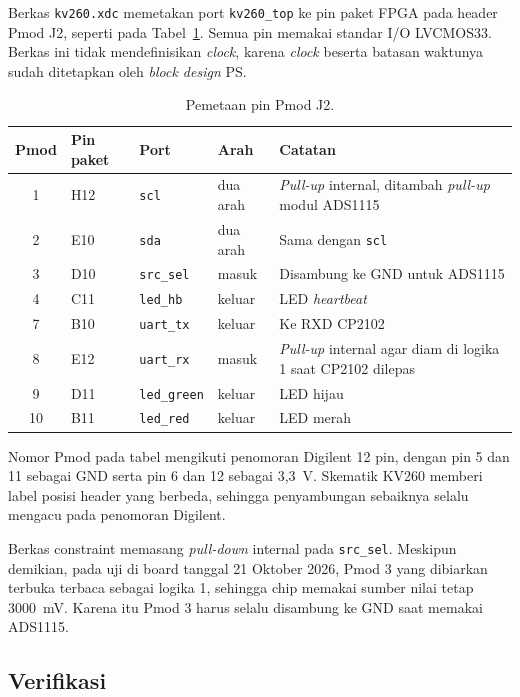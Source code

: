 \documentclass[11pt,a4paper]{article}
\begin{document}
Berkas \texttt{kv260.xdc} memetakan port \texttt{kv260\_top} ke pin paket FPGA pada header Pmod J2,
seperti pada Tabel~\ref{tab:xdc}. Semua pin memakai standar I/O LVCMOS33. Berkas ini tidak
mendefinisikan \textit{clock}, karena \textit{clock} beserta batasan waktunya sudah ditetapkan oleh
\textit{block design} PS.

\begin{table}[H]
  \centering
  \small
  \begin{tabularx}{\textwidth}{c l l l X}
    \toprule
    Pmod & Pin paket & Port & Arah & Catatan \\
    \midrule
    1 & H12 & \texttt{scl} & dua arah & \textit{Pull-up} internal, ditambah \textit{pull-up}
      modul ADS1115 \\
    2 & E10 & \texttt{sda} & dua arah & Sama dengan \texttt{scl} \\
    3 & D10 & \texttt{src\_sel} & masuk & Disambung ke GND untuk ADS1115 \\
    4 & C11 & \texttt{led\_hb} & keluar & LED \textit{heartbeat} \\
    7 & B10 & \texttt{uart\_tx} & keluar & Ke RXD CP2102 \\
    8 & E12 & \texttt{uart\_rx} & masuk & \textit{Pull-up} internal agar diam di logika 1 saat
      CP2102 dilepas \\
    9 & D11 & \texttt{led\_green} & keluar & LED hijau \\
    10 & B11 & \texttt{led\_red} & keluar & LED merah \\
    \bottomrule
  \end{tabularx}
  \caption{Pemetaan pin Pmod J2.}
  \label{tab:xdc}
\end{table}

Nomor Pmod pada tabel mengikuti penomoran Digilent 12 pin, dengan pin 5 dan 11 sebagai GND serta
pin 6 dan 12 sebagai 3,3~V. Skematik KV260 memberi label posisi header yang berbeda, sehingga
penyambungan sebaiknya selalu mengacu pada penomoran Digilent.

Berkas constraint memasang \textit{pull-down} internal pada \texttt{src\_sel}. Meskipun demikian,
pada uji di board tanggal 21 Oktober 2026, Pmod 3 yang dibiarkan terbuka terbaca sebagai logika 1,
sehingga chip memakai sumber nilai tetap 3000~mV. Karena itu Pmod 3 harus selalu disambung ke GND
saat memakai ADS1115.

\subsection{Verifikasi}
\label{subsec:verifikasi}
\end{document}
